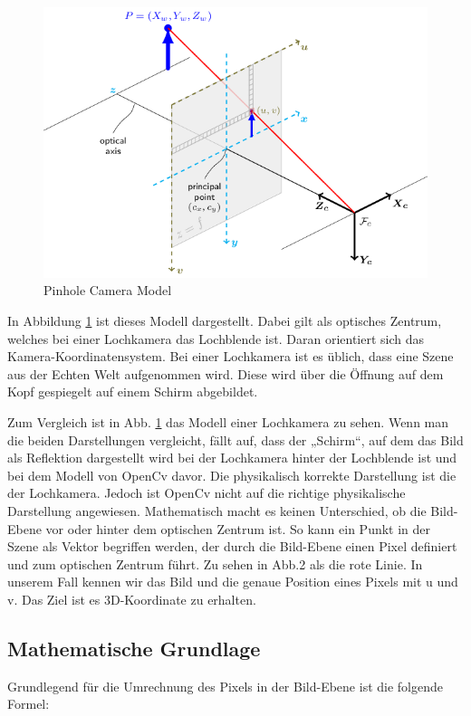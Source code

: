 	\begin{figure}[h]
		\centering
		\includegraphics[width=0.7\linewidth]{img/grundlagen/pinhole_camera_model.png}
		\caption[test]{Pinhole Camera Model}
		\label{fig:pinhole-camera-model}
	\end{figure}
	
	In Abbildung \ref{fig:pinhole-camera-model} ist dieses Modell dargestellt. Dabei gilt  als optisches Zentrum, welches bei einer Lochkamera das Lochblende ist. Daran orientiert sich das Kamera-Koordinatensystem. Bei einer Lochkamera ist es üblich, dass eine Szene aus der Echten Welt aufgenommen wird. Diese wird über die Öffnung auf dem Kopf gespiegelt auf einem Schirm abgebildet.
	
	
	
	Zum Vergleich ist in Abb. \ref{fig:pinhole-camera-model} das Modell einer Lochkamera zu sehen. Wenn man die beiden Darstellungen vergleicht, fällt auf, dass der „Schirm“, auf dem das Bild als Reflektion dargestellt wird bei der Lochkamera hinter der Lochblende ist und bei dem Modell von OpenCv davor. Die physikalisch korrekte Darstellung ist die der Lochkamera. Jedoch ist OpenCv nicht auf die richtige physikalische Darstellung angewiesen. Mathematisch macht es keinen Unterschied, ob die Bild-Ebene vor oder hinter dem optischen Zentrum ist. So kann ein Punkt in der Szene als Vektor begriffen werden, der durch die Bild-Ebene einen Pixel definiert und zum optischen Zentrum führt. Zu sehen in Abb.2 als die rote Linie. In unserem Fall kennen wir das Bild und die genaue Position eines Pixels mit u und v. Das Ziel ist es 3D-Koordinate zu erhalten.
	
	\newpage
	
	\subsection{Mathematische Grundlage}
	Grundlegend für die Umrechnung des Pixels in der Bild-Ebene ist die folgende Formel:
	
